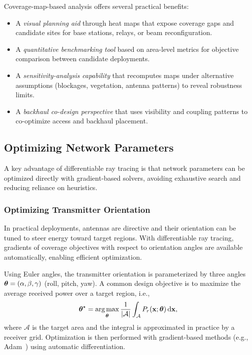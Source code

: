 Coverage-map-based analysis offers several practical benefits:
\begin{itemize}
  \item A \emph{visual planning aid} through heat maps that expose coverage gaps and candidate sites for base stations, relays, or beam reconfiguration.
  \item A \emph{quantitative benchmarking tool} based on area-level metrics for objective comparison between candidate deployments.
  \item A \emph{sensitivity-analysis capability} that recomputes maps under alternative assumptions (blockages, vegetation, antenna patterns) to reveal robustness limits.
  \item A \emph{backhaul co-design perspective} that uses visibility and coupling patterns to co-optimize access and backhaul placement.
\end{itemize}

\subsection{Optimizing Network Parameters}

A key advantage of differentiable ray tracing is that network parameters can be optimized directly with gradient-based solvers, avoiding exhaustive search and reducing reliance on heuristics.

\subsubsection{Optimizing Transmitter Orientation}

In practical deployments, antennas are directive and their orientation can be tuned to steer energy toward target regions. With differentiable ray tracing, gradients of coverage objectives with respect to orientation angles are available automatically, enabling efficient optimization.

Using Euler angles, the transmitter orientation is parameterized by three angles $\boldsymbol{\theta} = (\alpha, \beta, \gamma)$ (roll, pitch, yaw). A common design objective is to maximize the average received power over a target region, i.e.,
\begin{equation}
  \boldsymbol{\theta}^\star = \operatorname*{arg\,max}_{\boldsymbol{\theta}} \frac{1}{|\mathcal{A}|} \int_{\mathcal{A}} P_r(\mathbf{x}; \boldsymbol{\theta})\,\mathrm{d}\mathbf{x},
\end{equation}
where $\mathcal{A}$ is the target area and the integral is approximated in practice by a receiver grid. Optimization is then performed with gradient-based methods (e.g., Adam~) using automatic differentiation.

